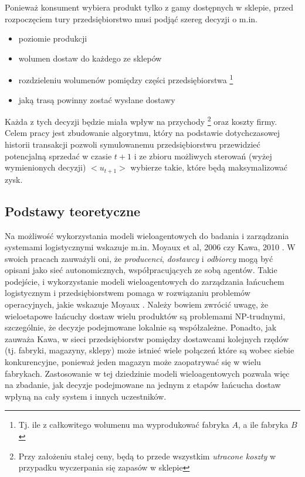 \documentclass{article}
\begin{document}
Ponieważ konsument wybiera produkt tylko z gamy dostępnych w sklepie, przed rozpoczęciem tury przedsiębiorstwo musi podjąć szereg decyzji o m.in.
	\begin{itemize}
		\item poziomie produkcji
		\item wolumen dostaw do każdego ze sklepów
		\item rozdzieleniu wolumenów pomiędzy części przedsiębiorstwa  \footnote{Tj. ile z całkowitego wolumenu ma wyprodukować fabryka $A$, a ile fabryka $B$}
	 	\item jaką trasą powinny zostać wysłane dostawy
	\end{itemize}

Każda z tych decyzji będzie miała wpływ na przychody \footnote{Przy założeniu stałej ceny, będą to przede wszystkim \textit{utracone koszty} w przypadku wyczerpania się zapasów w sklepie} oraz koszty firmy. Celem pracy jest zbudowanie algorytmu, który na podstawie dotychczasowej historii transakcji pozwoli symulowanemu przedsiębiorstwu przewidzieć potencjalną sprzedać w czasie $ t +1 $ i ze zbioru możliwych sterowań (wyżej wymienionych decyzji) $<u_{t+1}>$ wybierze takie, które będą maksymalizować zysk. 

\subsection{Podstawy teoretyczne}

Na możliwość wykorzystania modeli wieloagentowych do badania i zarządzania systemami logistycznymi wskazuje m.in. Moyaux et al, 2006 \cite{Moyaux2006}  czy Kawa, 2010 \cite{Kawa2010}. W swoich pracach zauważyli oni, że  \textit{producenci},  \textit{dostawcy} i  \textit{odbiorcy} mogą być opisani jako sieć autonomicznych, współpracujących ze sobą agentów. Takie podejście, i wykorzystanie modeli wieloagentowych do zarządzania łańcuchem logistycznym i przedsiębiorstwem pomaga w rozwiązaniu problemów operacyjnych, jakie wskazuje Moyaux \cite{Moyaux2006}. Należy bowiem zwrócić uwagę, że wieloetapowe łańcuchy dostaw wielu produktów są problemami NP-trudnymi, szczególnie, że decyzje podejmowane lokalnie są współzależne. Ponadto, jak zauważa Kawa, w sieci przedsiębiorstw pomiędzy dostawcami kolejnych rzędów (tj. fabryki, magazyny, sklepy) może istnieć wiele połączeń które są wobec siebie konkurencyjne, ponieważ jeden magazyn może zaopatrywać się w wielu fabrykach. Zastosowanie w tej dziedzinie modeli wieloagentowych pozwala więc na zbadanie, jak decyzje podejmowane na jednym z etapów łańcucha dostaw wpłyną na cały system i innych uczestników.  
\end{document}
